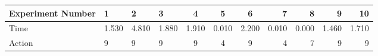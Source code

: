 \documentclass[8pt]{article}
\begin{document}
\begin{landscape}
\begin{tabular}{ | l | l | l | l | c | c | c | r | r | r | r | }
 \hline 
Experiment Number & 1 & 2 & 3 & 4 & 5 & 6 & 7 & 8 & 9 & 10\\ \hline
Time & 1.530 & 4.810 & 1.880 & 1.910 & 0.010 & 2.200 & 0.010 & 0.000 & 1.460 & 1.710\\ \hline
Action & 9 & 9 & 9 & 9 & 4 & 9 & 4 & 7 & 9 & 9\\ \hline\end{tabular}
\end{landscape}
\end{document}

